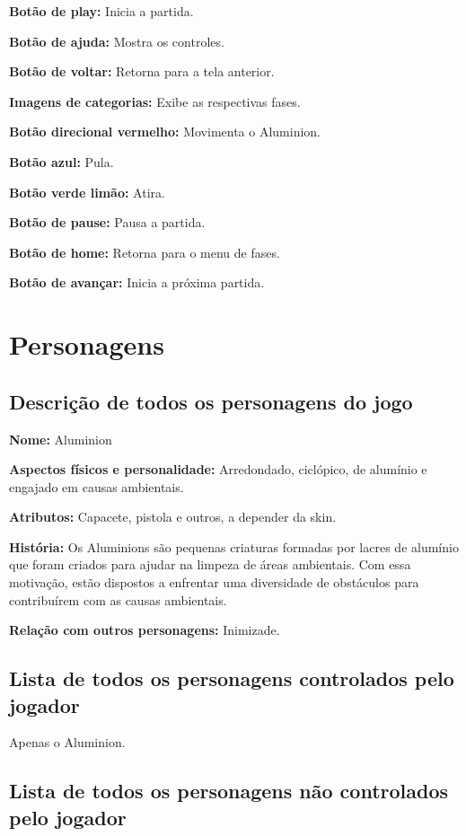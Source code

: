 \documentclass[]{scrartcl}
\begin{document}
\textbf{Botão de play:} Inicia a partida.

\textbf{Botão de ajuda:} Mostra os controles.

\textbf{Botão de voltar:} Retorna para a tela anterior.

\textbf{Imagens de categorias:} Exibe as respectivas fases.

\textbf{Botão direcional vermelho:} Movimenta o Aluminion.

\textbf{Botão azul:} Pula.

\textbf{Botão verde limão:} Atira.

\textbf{Botão de pause:} Pausa a partida.

\textbf{Botão de home:} Retorna para o menu de fases.

\textbf{Botão de avançar:} Inicia a próxima partida.

\section{Personagens}

\subsection{Descrição de todos os personagens do jogo}

\noindent\textbf{Nome:} Aluminion

\noindent\textbf{Aspectos físicos e personalidade:} Arredondado, ciclópico, de alumínio e engajado em causas ambientais.

\noindent\textbf{Atributos:} Capacete, pistola e outros, a depender da skin.

\noindent\textbf{História:} Os Aluminions são pequenas criaturas formadas por lacres de alumínio que foram criados para ajudar na limpeza de áreas ambientais. Com essa motivação, estão dispostos a enfrentar uma diversidade de obstáculos para contribuírem com as causas ambientais.

\noindent\textbf{Relação com outros personagens:} Inimizade.

\subsection{Lista de todos os personagens controlados pelo jogador}

Apenas o Aluminion.

\subsection{Lista de todos os personagens não controlados pelo jogador}
\end{document}
